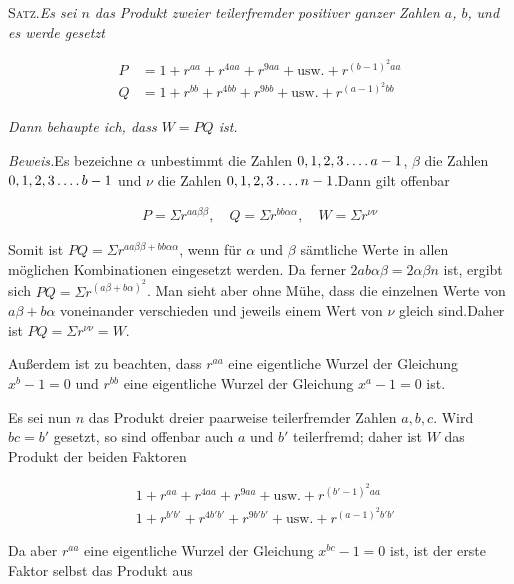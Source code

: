 
\textsc{Satz.}\quad \textit{Es sei $n$ das Produkt zweier teilerfremder positiver ganzer Zahlen $a$, $b$,} \textit{und es werde gesetzt}

\[
\begin{aligned}
P&=1+ r^{aa}+r^{4aa}+r^{9aa}+\text{usw.}+r^{(b-1)^2aa}\\
Q&=1+r^{bb}+r^{4bb}+r^{9bb}+\text{usw.}+r^{(a-1)^2bb}
\end{aligned}
\]

\textit{Dann behaupte ich, dass $W=PQ$ ist.}

\textit{Beweis.}\quad Es bezeichne $\alpha$ unbestimmt die Zahlen $0,1,2,3\mathinner{.\,.\,.\,.} a-1$, $\beta$ die Zahlen $0,1,2,3\mathinner{.\,.\,.\,.} b-1$ und $\nu$ die Zahlen $0,1,2,3\mathinner{.\,.\,.\,.} n-1$.\quad Dann gilt offenbar

\[
\begin{aligned}
P=\Sigma r^{aa\beta\beta},\quad Q=\Sigma r^{bb\alpha\alpha},\quad W=\Sigma r^{\nu\nu}
\end{aligned}
\]

Somit ist $PQ=\Sigma r^{aa\beta\beta+bb\alpha\alpha}$, wenn für $\alpha$ und $\beta$ sämtliche Werte in allen möglichen Kombinationen eingesetzt werden. Da ferner $2ab\alpha\beta=2\alpha\beta n$ ist, ergibt sich $PQ=\Sigma r^{(a\beta+b\alpha)^2}$. Man sieht aber ohne Mühe, dass die einzelnen Werte von $a\beta+b\alpha$ voneinander verschieden und jeweils einem Wert von $\nu$ gleich sind.\quad Daher ist $PQ=\Sigma r^{\nu\nu}=W$.

Außerdem ist zu beachten, dass $r^{aa}$ eine eigentliche Wurzel der Gleichung $x^b-1=0$ und $r^{bb}$ eine eigentliche Wurzel der Gleichung $x^a-1=0$ ist.



Es sei nun $n$ das Produkt dreier paarweise teilerfremder Zahlen $a,b,c$. Wird $bc=b'$ gesetzt, so sind offenbar auch $a$ und $b'$ teilerfremd; daher ist $W$ das Produkt der beiden Faktoren

\[
\begin{aligned}
&1+r^{aa}+r^{4aa}+r^{9aa}+\text{usw.}+r^{(b'-1)^2aa}\\
&1+r^{b'b'}+r^{4b'b'}+r^{9b'b'}+\text{usw.}+r^{(a-1)^2b'b'}
\end{aligned}
\]

Da aber $r^{aa}$ eine eigentliche Wurzel der Gleichung $x^{bc}-1=0$ ist, ist der erste Faktor selbst das Produkt aus

